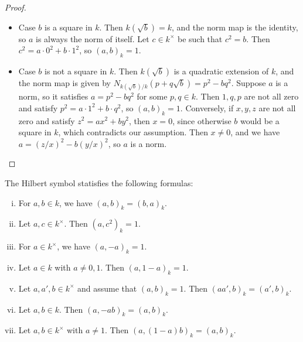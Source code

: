 \begin{proof}
	\leanok
	\begin{itemize}
		\item Case $b$ is a square in $k$. Then $k(\sqrt{b}) = k$, and the norm map is the identity, so
		$a$ is always the norm of itself. Let $c \in k^\times$ be such that $c^2 = b$.
		Then $c^2 = a \cdot 0^2 + b \cdot 1^2$, so $(a,b)_k=1$.
		\item Case $b$ is not a square in $k$. Then $k(\sqrt{b})$ is a quadratic extension of $k$, and
		the norm map is given by $N_{k(\sqrt{b})/k}(p + q \sqrt{b}) = p^2 - b q^2$.
		Suppose $a$ is a norm, so it satisfies $a = p^2 - b q^2$ for some $p, q \in k$.
		Then $1, q, p$ are not all zero and satisfy $ p^2 = a \cdot 1^2 + b \cdot q^2$,
		so $(a, b)_k = 1$. Conversely, if $x, y, z$ are not all zero and satisfy $z^2 = ax^2 + by^2$,
		then $x=0$, since otherwise $b$ would be a square in $k$, which contradicts our assumption.
		Then $x \ne 0$, and we have $a = (z/x)^2 - b (y/x)^2$, so $a$ is a norm.
	\end{itemize}
\end{proof}

\begin{proposition}
	\label{prop:hilbert_symbol_properties}
	\leanok
	The Hilbert symbol statisfies the following formulas:
	\begin{enumerate}[(i)]
		\item For $a, b \in k$, we have $(a, b)_k = (b, a)_k$.
		\item Let $a, c \in k^\times$. Then $(a, c^2)_k = 1$.
		\item For $a \in k^\times$, we have $(a, -a)_k = 1$.
		\item Let $a \in k$ with $a \ne 0, 1$. Then $(a, 1 - a)_k = 1$.
		\item Let $a, a', b \in k^\times$ and assume that $(a, b)_k = 1$. Then $(a a', b)_k = (a', b)_k$.
		\item Let $a, b \in k$. Then $(a, -ab)_k = (a, b)_k$.
		\item Let $a, b \in k^\times$ with $a \ne 1$. Then $(a, (1-a)b)_k = (a, b)_k$.
	\end{enumerate}
\end{proposition}

